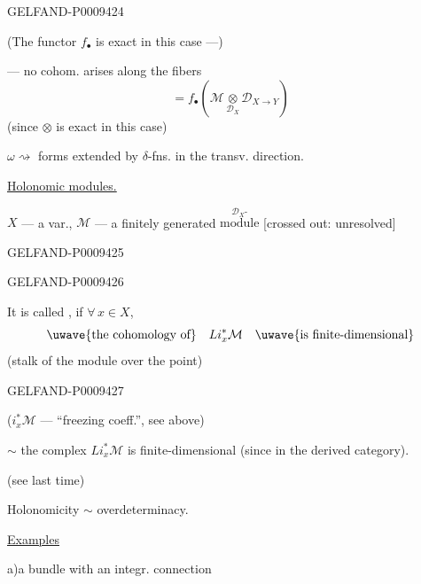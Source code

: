 \begin{GelfandAdjacentEvidence}{GELFAND-P000942}{4}


(The functor $f_\bullet$ is exact in this case ---)

--- no cohom. arises along the fibers
\[
 =f_\bullet\left(\mathcal M\mathbin{\underset{\mathcal D_X}{\otimes}}\mathcal D_{X\to Y}\right)
\]
(since $\otimes$ is exact in this case)

$\omega\rightsquigarrow$ forms extended by $\delta$-fns. in the transv. direction.

\underline{Holonomic modules.}

$X$ --- a var., $\mathcal M$ --- a finitely generated
\(\overset{\mathcal D_X\text{-}}{\text{module}}\) [crossed out: unresolved]
\end{GelfandAdjacentEvidence}
\begin{GelfandAdjacentEvidence}{GELFAND-P000942}{5}

\end{GelfandAdjacentEvidence}
\begin{GelfandAdjacentEvidence}{GELFAND-P000942}{6}


It is called , if $\forall\,x\in X$,
\[
 \text{\uwave{the cohomology of}}\quad Li_x^*\mathcal M\quad
 \text{\uwave{is finite-dimensional}}
\]
(stalk of the module over the point)
\end{GelfandAdjacentEvidence}
\begin{GelfandAdjacentEvidence}{GELFAND-P000942}{7}


($i_x^*\mathcal M$ --- “freezing coeff.”, see above)

$\sim$ the complex $Li_x^*\mathcal M$ is finite-dimensional (since in the derived category).

\quad{} (see last time)

Holonomicity $\sim$ overdeterminacy.

\underline{Examples}

a)\enspace [inserted above: $X=\mathbb R^1$ (?)] a bundle with an integr. connection
\end{GelfandAdjacentEvidence}
